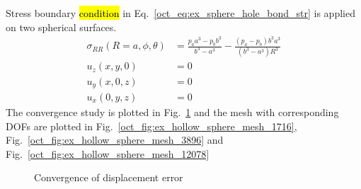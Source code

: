 Stress boundary \hl{condition} in Eq.~\ref{oct_eq:ex_sphere_hole_bond_str} is applied on two spherical surfaces.
\begin{subequations}
    \begin{align}
    \sigma_{RR}(R=a,\phi,\theta) & = \frac{p_aa^3-p_bb^3}{b^3-a^3} - \frac{(p_a-p_b)b^3a^3}{(b^3-a^3)R^3}\\
    u_z(x,y,0) &= 0\\
    u_y(x,0,z) & = 0 \\
    u_x(0,y,z) & = 0
  \end{align}
\label{oct_eq:ex_sphere_hole_bond_str}
\end{subequations}
%
The convergence study is plotted in Fig.~\ref{oct_fig:ex_hollow_sphere_conv} and the mesh with corresponding DOFs are plotted in Fig.~\ref{oct_fig:ex_hollow_sphere_mesh_1716}, Fig.~\ref{oct_fig:ex_hollow_sphere_mesh_3896} and Fig.~\ref{oct_fig:ex_hollow_sphere_mesh_12078}
\begin{figure}[h!]
    \centering
    \caption{Convergence of displacement error}
    \label{oct_fig:ex_hollow_sphere_conv}
\end{figure}